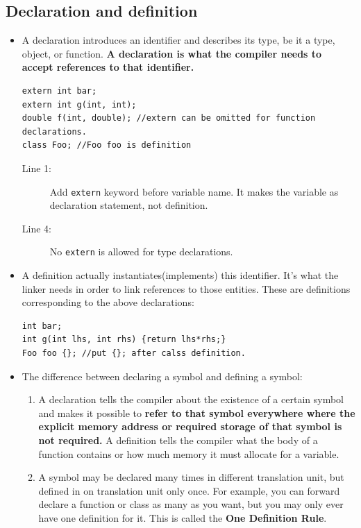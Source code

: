 \documentclass[a4paper,11pt,twoside]{book}
\begin{document}
\subsection{Declaration and definition}
\begin{itemize}
	\item A declaration introduces an identifier and describes its type, be it a type, object, or function. \textbf{A declaration is what the compiler needs to accept references to that identifier.} 
	
\begin{lstlisting}
extern int bar;
extern int g(int, int); 
double f(int, double); //extern can be omitted for function declarations.
class Foo; //Foo foo is definition
\end{lstlisting}

\begin{description}
	\item[Line 1:] Add \texttt{extern} keyword before variable name. It makes the variable as declaration statement, not definition.
	
	\item[Line 4:] No \texttt{extern} is allowed for type declarations.
\end{description}
	
	\item A definition actually instantiates(implements) this identifier. It's what the linker needs in order to link references to those entities. These are definitions corresponding to the above declarations:

\begin{lstlisting}[numbers=none]
int bar;
int g(int lhs, int rhs) {return lhs*rhs;}
Foo foo {}; //put {}; after calss definition.
\end{lstlisting}
	
	\item The difference between declaring a symbol and defining a symbol:
	\begin{enumerate}
		\item A declaration tells the compiler about the existence of a certain symbol and makes it possible to \textbf{refer to that symbol everywhere where the explicit memory address or required storage of that symbol is not required.}  A definition tells the compiler what the body of a function contains or how much memory it must allocate for a variable.
		
		\item A symbol may be declared many times in different translation unit, but defined in on translation unit only once. For example, you can forward declare a function or class as many as  you want, but you may only ever have one definition for it. This is called the \textbf{One Definition Rule}.
	\end{enumerate}

\end{itemize}
\end{document}
